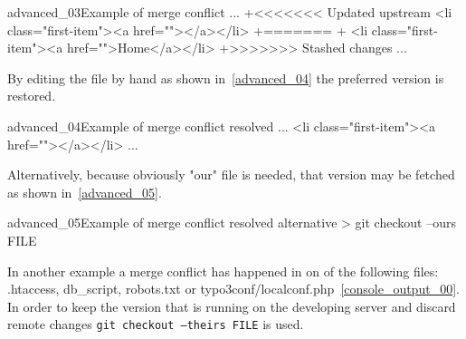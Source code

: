 \begin{codelisting}{advanced_03}{Example of merge conflict}
...
+<<<<<<< Updated upstream                                                                                                                                                                                                                    
    <li class="first-item"><a href=""></a></li>
+=======                                                                                                                                                                                                                                     
+   <li class="first-item"><a href="">Home</a></li>                                                                                                                                                              
+>>>>>>> Stashed changes
...
\end{codelisting}
By editing the file by hand as shown in~\ref{advanced_04} the preferred version is restored.
\begin{codelisting}{advanced_04}{Example of merge conflict resolved}
...
    <li class="first-item"><a href=""></a></li>
...
\end{codelisting}
Alternatively, because obviously "our" file is needed, that version may be fetched as shown in~\ref{advanced_05}.
\begin{codelisting}{advanced_05}{Example of merge conflict resolved alternative}
> git checkout --ours FILE
\end{codelisting}
In another example a merge conflict has happened in on of the following files: .htaccess, db\_script, robots.txt or typo3conf/localconf.php~\ref{console_output_00}. In order to keep the version that is running on the developing server and discard remote changes \texttt{git checkout --theirs FILE} is used.
